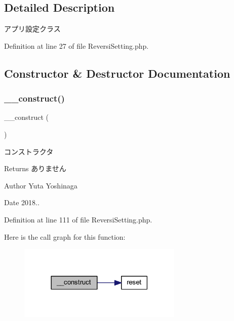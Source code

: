 \subsection{Detailed Description}
アプリ設定クラス 

Definition at line 27 of file Reversi\+Setting.\+php.



\subsection{Constructor \& Destructor Documentation}
\mbox{\label{class_reversi_setting_a095c5d389db211932136b53f25f39685}} 
\subsubsection{\texorpdfstring{\+\_\+\+\_\+construct()}{\_\_construct()}}
{\footnotesize\ttfamily \+\_\+\+\_\+construct (\begin{DoxyParamCaption}{ }\end{DoxyParamCaption})}



コンストラクタ 

\begin{DoxyReturn}{Returns}
ありません 
\end{DoxyReturn}
\begin{DoxyAuthor}{Author}
Yuta Yoshinaga 
\end{DoxyAuthor}
\begin{DoxyDate}{Date}
2018.. 
\end{DoxyDate}


Definition at line 111 of file Reversi\+Setting.\+php.

Here is the call graph for this function\+:\nopagebreak
\begin{figure}[H]
\begin{center}
\leavevmode
\includegraphics[width=222pt]{class_reversi_setting_a095c5d389db211932136b53f25f39685_cgraph}
\end{center}
\end{figure}
\mbox{\label{class_reversi_setting_a421831a265621325e1fdd19aace0c758}} 
